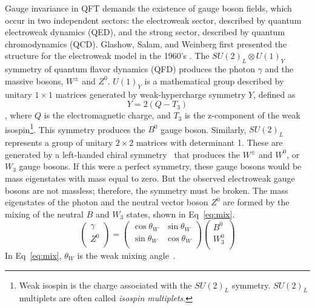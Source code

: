 Gauge invariance in QFT demands the existence of gauge boson fields, which occur in two independent sectors: the electroweak sector, described by quantum electroweak dynamics (QED), and the strong sector, described by quantum chromodynamics (QCD).  Glashow, Salam, and Weinberg first presented the structure for the electroweak model in the 1960's \cite{Glashow:1961tr,  Salam:1968rm, PhysRevLett.19.1264}.  The $SU(2)_L\otimes U(1)_Y$ symmetry of quantum flavor dynamics (QFD) produces the photon $\gamma$ and the massive bosons, $W^\pm$ and $Z^0$.  $U(1)_Y$ is a mathematical group described by unitary $1\times1$ matrices generated by weak-hypercharge symmetry $Y$, defined as 
\begin{equation}
Y=  2(Q-T_3)
\label{eq:Y}
\end{equation}
, where $Q$ is the electromagnetic charge, and $T_3$ is the z-component of the weak isospin\footnote{Weak isospin is the charge associated with the $SU(2)_L$ symmetry.  $SU(2)_L$ multiplets are often called \textit{isospin multiplets}.}.   This symmetry produces the $B^0$ gauge boson.  Similarly, $SU(2)_L$ represents a group of unitary $2\times2$ matrices with determinant 1.  These are generated by a left-handed chiral symmetry~\cite{koch} that produces the $W^{\pm}$ and $W^0$, or $W_3$ gauge bosons.  If this were a perfect symmetry, these gauge bosons would be mass eigenstates with mass equal to zero. But the observed electroweak gauge bosons are not massless; therefore, the symmetry must be broken.  The mass eigenstates of the photon and the neutral vector boson $Z^0$ are formed by the mixing of the neutral $B$ and $W_3$ states, shown in Eq~\ref{eq:mix}.
\begin{equation}
\begin{pmatrix}
\gamma \\
Z^0 \\
\end{pmatrix}
=
\begin{pmatrix}
\cos\theta_W & \sin\theta_W\\
\sin\theta_W & \cos\theta_W\\
\end{pmatrix}
\begin{pmatrix}
B^0 \\
W_3^0 \\
\end{pmatrix}
\label{eq:mix}
\end{equation}
In Eq~\ref{eq:mix}, $\theta_W$ is the weak mixing angle~\cite{BILENKY198273}.  

